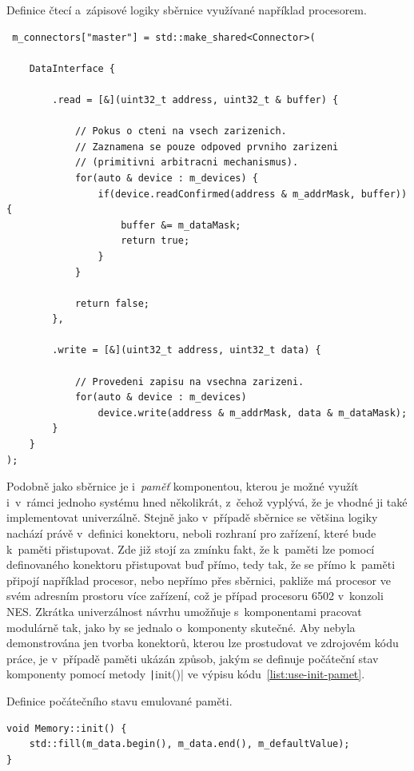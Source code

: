 \begin{listing}
	\caption{Definice čtecí a~zápisové logiky sběrnice využívané například procesorem.}
	\label{list:use-sbernice}
	\begin{verbatim}
 m_connectors["master"] = std::make_shared<Connector>(
	
	DataInterface {
	
		.read = [&](uint32_t address, uint32_t & buffer) {
	
			// Pokus o cteni na vsech zarizenich.
			// Zaznamena se pouze odpoved prvniho zarizeni 
			// (primitivni arbitracni mechanismus).
			for(auto & device : m_devices) {
				if(device.readConfirmed(address & m_addrMask, buffer)) {
					buffer &= m_dataMask;
					return true;
				}
			}
			
			return false;
		},
	
		.write = [&](uint32_t address, uint32_t data) {
	
			// Provedeni zapisu na vsechna zarizeni.		
			for(auto & device : m_devices)
				device.write(address & m_addrMask, data & m_dataMask);
		}
	}
);
	\end{verbatim}
\end{listing}

Podobně jako sběrnice je i~\emph{paměť} komponentou, kterou je možné využít i~v~rámci jednoho systému hned několikrát, z~čehož vyplývá, že je vhodné ji také implementovat univerzálně. Stejně jako v~případě sběrnice se většina logiky nachází právě v~definici konektoru, neboli rozhraní pro zařízení, které bude k~paměti přistupovat. Zde již stojí za zmínku fakt, že k~paměti lze pomocí definovaného konektoru přistupovat buď přímo, tedy tak, že se přímo k~paměti připojí například procesor, nebo nepřímo přes sběrnici, pakliže má procesor ve svém adresním prostoru více zařízení, což je případ procesoru 6502 v~konzoli NES. Zkrátka univerzálnost návrhu umožňuje s~komponentami pracovat modulárně tak, jako by se jednalo o~komponenty skutečné. Aby nebyla demonstrována jen tvorba konektorů, kterou lze prostudovat ve zdrojovém kódu práce, je v~případě paměti ukázán způsob, jakým se definuje počáteční stav komponenty pomocí metody \texttt|init()| ve výpisu kódu~\ref{list:use-init-pamet}.

\begin{listing}
	\caption{Definice počátečního stavu emulované paměti.}
	\label{list:use-init-pamet}
	\begin{verbatim}
void Memory::init() {
	std::fill(m_data.begin(), m_data.end(), m_defaultValue);
}
	\end{verbatim}
\end{listing}


